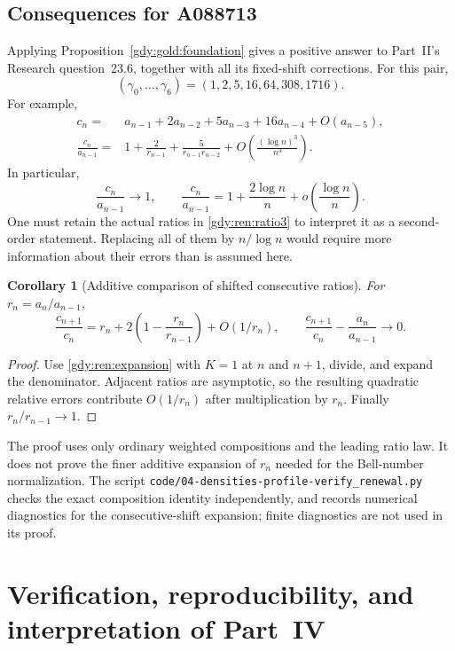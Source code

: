 \documentclass[11pt]{article}
\numberwithin{equation}{section}
\newtheorem{corollary}[theorem]{Corollary}
\theoremstyle{definition}
\theoremstyle{remark}
\begin{document}
\subsection{Consequences for A088713}
Applying Proposition~\ref{gdy:gold:foundation} gives a positive answer to
Part~II's Research question~23.6, together with all its fixed-shift
corrections. For this pair,
\[
 (\gamma_0,\ldots,\gamma_6)=(1,2,5,16,64,308,1716).
\]
For example,
\begin{align}
 c_n={}&a_{n-1}+2a_{n-2}+5a_{n-3}+16a_{n-4}
           +O(a_{n-5}),\label{gdy:ren:four}\\
 \frac{c_n}{a_{n-1}}
   ={}&1+\frac2{r_{n-1}}
       +\frac5{r_{n-1}r_{n-2}}
       +O\!\left(\frac{(\log n)^3}{n^3}\right).\label{gdy:ren:ratio3}
\end{align}
In particular,
\begin{equation}\label{gdy:ren:first}
 \frac{c_n}{a_{n-1}}\longrightarrow1,
 \qquad
 \frac{c_n}{a_{n-1}}=1+\frac{2\log n}{n}
                       +o\!\left(\frac{\log n}{n}\right).
\end{equation}
One must retain the actual ratios in \eqref{gdy:ren:ratio3} to interpret it
as a second-order statement. Replacing all of them by $n/\log n$
would require more information about their errors than is assumed here.

\begin{corollary}[Additive comparison of shifted consecutive ratios]
\label{gdy:ren:additive}
For $r_n=a_n/a_{n-1}$,
\[
 \frac{c_{n+1}}{c_n}
   =r_n+2\left(1-\frac{r_n}{r_{n-1}}\right)+O(1/r_n),
 \qquad
 \frac{c_{n+1}}{c_n}-\frac{a_n}{a_{n-1}}\longrightarrow0.
\]
\end{corollary}
\begin{proof}
Use \eqref{gdy:ren:expansion} with $K=1$ at $n$ and $n+1$, divide, and
expand the denominator. Adjacent ratios are asymptotic, so the resulting
quadratic relative errors contribute $O(1/r_n)$ after multiplication
by $r_n$. Finally $r_n/r_{n-1}\to1$.
\end{proof}

The proof uses only ordinary weighted compositions and the leading ratio
law. It does not prove the finer additive expansion of $r_n$ needed for
the Bell-number normalization. The script \nolinkurl{code/04-densities-profile-verify_renewal.py}
checks the exact composition identity independently, and records numerical
diagnostics for the consecutive-shift expansion; finite diagnostics are
not used in its proof.

\section{Verification, reproducibility, and interpretation of Part~IV}\label{gdy:verify:section}
\end{document}
